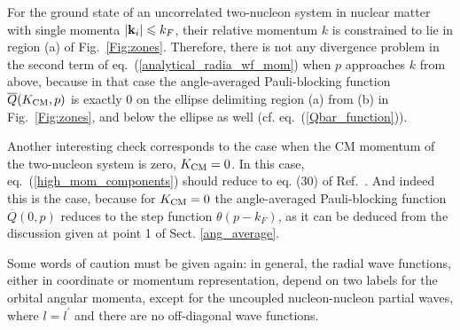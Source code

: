 \documentclass[aps,twocolumn,showpacs,preprintnumbers,amsmath,amssymb,nofootinbib,superscriptaddress,showkeys,noeprint]{revtex4-1}
\newcommand{\nk}{{\bf k}}
\begin{document}
For the ground state of an uncorrelated two-nucleon system in nuclear
matter with single momenta $\left| \nk_i \right| \leqslant k_F$, their
relative momentum $k$ is constrained to lie in region (a) of
Fig.~\ref{Fig:zones}. Therefore, there is not any divergence problem
in the second term of eq.~(\ref{analytical_radia_wf_mom}) when $p$
approaches $k$ from above, because in that case the angle-averaged
Pauli-blocking function $\overline{Q}(K_{\rm CM},p)$ is exactly $0$ on
the ellipse delimiting region (a) from (b) in Fig.~\ref{Fig:zones},
and below the ellipse as well (cf. eq.~(\ref{Qbar_function})).

Another interesting check corresponds to the case when the CM momentum
of the two-nucleon system is zero, $K_{\rm CM}=0$. In this case,
eq.~(\ref{high_mom_components}) should reduce to eq. (30) of
Ref.~\cite{RuizSimo:2017tcb}.  And indeed this is the case, because
for $K_{\rm CM}=0$ the angle-averaged Pauli-blocking function
$\overline{Q}(0,p)$ reduces to the step function $\theta(p-k_F)$, as
it can be deduced from the discussion given at point 1 of Sect.
\ref{ang_average}.

Some words of caution must be given again: in general, the radial wave
functions, either in coordinate or momentum representation, depend on
two labels for the orbital angular momenta, except for the uncoupled
nucleon-nucleon partial waves, where $l=l^\prime$ and there are no
off-diagonal wave functions.
\end{document}
